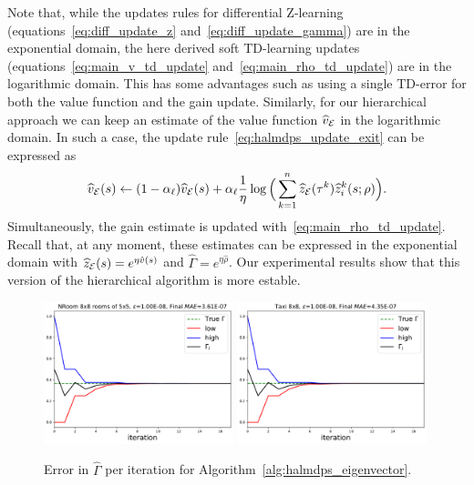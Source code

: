 Note that, while the updates rules for differential Z-learning (equations~\eqref{eq:diff_update_z} and~\eqref{eq:diff_update_gamma}) are in the exponential domain, the here derived soft TD-learning updates (equations~\eqref{eq:main_v_td_update} and~\eqref{eq:main_rho_td_update}) are in the logarithmic domain. This has some advantages such as using a single TD-error for both the value function and the gain update. Similarly, for our hierarchical approach we can keep an estimate of the value function $\widehat v_{\mathcal{E}}$ in the logarithmic domain. In such a case, the update rule~\eqref{eq:halmdps_update_exit} can be expressed as 
\begin{equation*}
    \widehat v_{\mathcal{E}}(s)\gets (1-\alpha_\ell) \widehat v_{\mathcal{E}}(s) + \alpha_\ell\frac{1}{\eta} \log\Big(\sum_{k=1}^n \widehat z_{\mathcal{E}}(\tau^k) \widehat z_i^k(s;\rho)\Big).
\end{equation*}
Simultaneously, the gain estimate is updated with~\eqref{eq:main_rho_td_update}. Recall that, at any moment, these estimates can be expressed in the exponential domain with $\widehat z_{\mathcal{E}}(s)=e^{\eta\hat v(s)}$ and $\widehat\Gamma=e^{\eta\hat\rho}$. Our experimental results show that this version of the hierarchical algorithm is more estable.

\begin{figure}[!ht]
  \centering
  \includegraphics*[width=0.49\textwidth]{figures/chapter2/eigenvectors/lmdp-nroom-3.pdf}
  \includegraphics*[width=0.49\textwidth]{figures/chapter2/eigenvectors/lmdp-taxi-8.pdf}
  \caption{Error in $\widehat\Gamma$ per iteration for Algorithm~\ref{alg:halmdps_eigenvector}.}
  \label{fig:eigenvectos}
 \end{figure}

